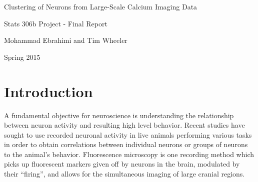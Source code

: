\documentclass[10pt]{article}
\newcommand{\calcium}[0]{Ca\textsuperscript{2+}}
\newcommand{\todo}[1]{\textcolor{red}{#1}}
\begin{document}
\begin{center}
    {\LARGE Clustering of Neurons from Large-Scale Calcium Imaging Data}

    Stats 306b Project - Final Report

    Mohammad Ebrahimi and Tim Wheeler

    Spring 2015
\end{center}

\begin{abstract}
Fluorescent imaging allows for the analysis of signalling behavior on a per-neuron basis in anesthetized and awake behaving animals. %
Existing methods monitor {\calcium} dynamics over a large region, but recently developed automated methods allow for isolating signals and associating them with particular neurons.
The resulting set of candidate neurons suffers from the presence of background structures such as blood vessels.
This project applies clustering methods to candidate objects in a one-photon {\calcium} dataset for the classification of neurons from background structures.
\todo{Hierarchical clustering was performed to identify preliminary classes.}
\todo{Principle component analysis was performed to identify preliminary important features and a clustering analysis was conducted using the first two principle components.}
\todo{Sparse clustering and sparse principle component analysis were conducted to identify a reduced featureset which captures the majority of the variation in the data.}
\todo{Group validation was performed by comparing the clusters obtained in the first dataset to the clusters obtained in a withheld dataset.}
\todo{Results indicate...}
\end{abstract}


\section{Introduction}

A fundamental objective for neuroscience is understanding the relationship between neuron activity and resulting high level behavior.
Recent studies have sought to use recorded neuronal activity in live animals performing various tasks in order to obtain correlations between individual neurons or groups of neurons to the animal's behavior. Fluorescence microscopy is one recording method which picks up fluorescent markers given off by neurons in the brain, modulated by their ``firing'', and allows for the simultaneous imaging of large cranial regions.
\end{document}

